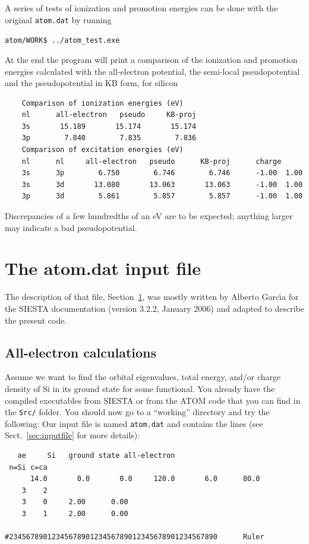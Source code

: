\documentclass[11pt]{article}
\begin{document}
A series of tests of ionization and promotion energies can be done with the original \texttt{atom.dat}
by running

\noindent\texttt{atom/WORK\$ ../atom{\_}test.exe}

At the end the program will print a comparison of the ionization and promotion energies
calculated with the all-electron potential, the semi-local pseudopotential and the
pseudopotential in KB form, for silicon
\begin{verbatim}
    Comparison of ionization energies (eV)
    nl      all-electron   pseudo     KB-proj
    3s       15.189       15.174       15.174
    3p        7.840        7.835        7.836
    Comparison of excitation energies (eV)
    nl      nl     all-electron   pseudo      KB-proj      charge
    3s      3p        6.750        6.746        6.746      -1.00  1.00
    3s      3d       13.080       13.063       13.063      -1.00  1.00
    3p      3d        5.861        5.857        5.857      -1.00  1.00
\end{verbatim}
Discrepancies of a few hundredths of an eV are to be expected; anything larger
may indicate a bad pseudopotential.



\section{The atom.dat input file}
\label{sec:atomdat}
The description of that file, Section~\ref{sec:atomdat}, was mostly written by Alberto Garc\'{\i}a
for the \textsc{SIESTA} documentation (version 3.2.2, January 2006) and adapted to
describe the present code.

\subsection{All-electron calculations}
\label{sec:atomdat-ae}

Assume we want to find the orbital eigenvalues, total energy, and/or
charge density of Si in its ground state for some functional.
You already have the compiled executables from \textsc{SIESTA} or
from the \textsc{ATOM} code that you can find in the \texttt{Src/} folder.
You should now go to a ``working''
directory and try the following:  Our
input file is named \texttt{atom.dat} and contains the lines (see
Sect.~\ref{sec:inputfile} for more details):

\begin{verbatim}
   ae     Si   ground state all-electron
 n=Si c=ca
      14.0       0.0       0.0     120.0       6.0      80.0
    3    2
    3    0     2.00      0.00
    3    1     2.00      0.00

#2345678901234567890123456789012345678901234567890      Ruler
\end{verbatim}
\end{document}
